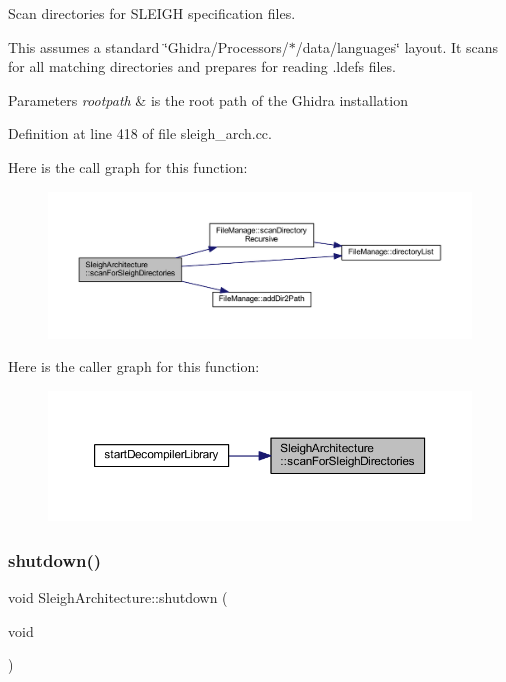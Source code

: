 Scan directories for S\+L\+E\+I\+GH specification files. 

This assumes a standard \char`\"{}\+Ghidra/\+Processors/$\ast$/data/languages\char`\"{} layout. It scans for all matching directories and prepares for reading .ldefs files. 
\begin{DoxyParams}{Parameters}
{\em rootpath} & is the root path of the Ghidra installation \\
\hline
\end{DoxyParams}


Definition at line 418 of file sleigh\+\_\+arch.\+cc.

Here is the call graph for this function\+:
\nopagebreak
\begin{figure}[H]
\begin{center}
\leavevmode
\includegraphics[width=350pt]{class_sleigh_architecture_a192dd872ccfe2a7f7a3ad18709fa37aa_cgraph}
\end{center}
\end{figure}
Here is the caller graph for this function\+:
\nopagebreak
\begin{figure}[H]
\begin{center}
\leavevmode
\includegraphics[width=350pt]{class_sleigh_architecture_a192dd872ccfe2a7f7a3ad18709fa37aa_icgraph}
\end{center}
\end{figure}
\mbox{\label{class_sleigh_architecture_a1765d06764b5b9d284340a2c457011f8}} 
\subsubsection{\texorpdfstring{shutdown()}{shutdown()}}
{\footnotesize\ttfamily void Sleigh\+Architecture\+::shutdown (\begin{DoxyParamCaption}\item[{void}]{ }\end{DoxyParamCaption})\hspace{0.3cm}{\ttfamily [static]}}



